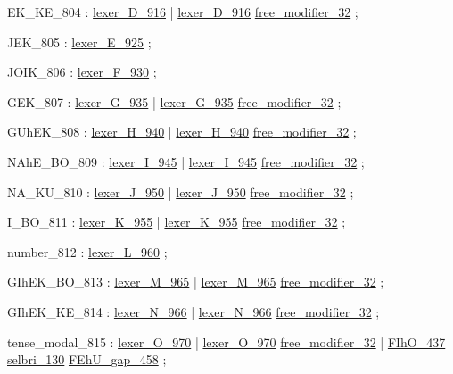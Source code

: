 \label{html:y804}
EK_KE_804               :  \hyperref[html:y916]{lexer_D_916}
                        |  \hyperref[html:y916]{lexer_D_916}  \hyperref[html:y32]{free_modifier_32}
                        ;

\label{html:y805}
JEK_805                 :  \hyperref[html:y925]{lexer_E_925}
                        ;

\label{html:y806}
JOIK_806                :  \hyperref[html:y930]{lexer_F_930}
                        ;

\label{html:y807}
GEK_807                 :  \hyperref[html:y935]{lexer_G_935}
                        |  \hyperref[html:y935]{lexer_G_935}  \hyperref[html:y32]{free_modifier_32}
                        ;

\label{html:y808}
GUhEK_808               :  \hyperref[html:y940]{lexer_H_940}
                        |  \hyperref[html:y940]{lexer_H_940}  \hyperref[html:y32]{free_modifier_32}
                        ;

\label{html:y809}
NAhE_BO_809             :  \hyperref[html:y945]{lexer_I_945}
                        |  \hyperref[html:y945]{lexer_I_945}  \hyperref[html:y32]{free_modifier_32}
                        ;

\label{html:y810}
NA_KU_810               :  \hyperref[html:y950]{lexer_J_950}
                        |  \hyperref[html:y950]{lexer_J_950}  \hyperref[html:y32]{free_modifier_32}
                        ;

\label{html:y811}
I_BO_811                :  \hyperref[html:y955]{lexer_K_955}
                        |  \hyperref[html:y955]{lexer_K_955}  \hyperref[html:y32]{free_modifier_32}
                        ;

\label{html:y812}
number_812              :  \hyperref[html:y960]{lexer_L_960}
                        ;

\label{html:y813}
GIhEK_BO_813            :  \hyperref[html:y965]{lexer_M_965}
                        |  \hyperref[html:y965]{lexer_M_965}  \hyperref[html:y32]{free_modifier_32}
                        ;

\label{html:y814}
GIhEK_KE_814            :  \hyperref[html:y966]{lexer_N_966}
                        |  \hyperref[html:y966]{lexer_N_966}  \hyperref[html:y32]{free_modifier_32}
                        ;

\label{html:y815}
tense_modal_815         :  \hyperref[html:y970]{lexer_O_970}
                        |  \hyperref[html:y970]{lexer_O_970}  \hyperref[html:y32]{free_modifier_32}
                        |  \hyperref[html:y437]{FIhO_437}  \hyperref[html:y130]{selbri_130}  \hyperref[html:y458]{FEhU_gap_458}
                        ;

